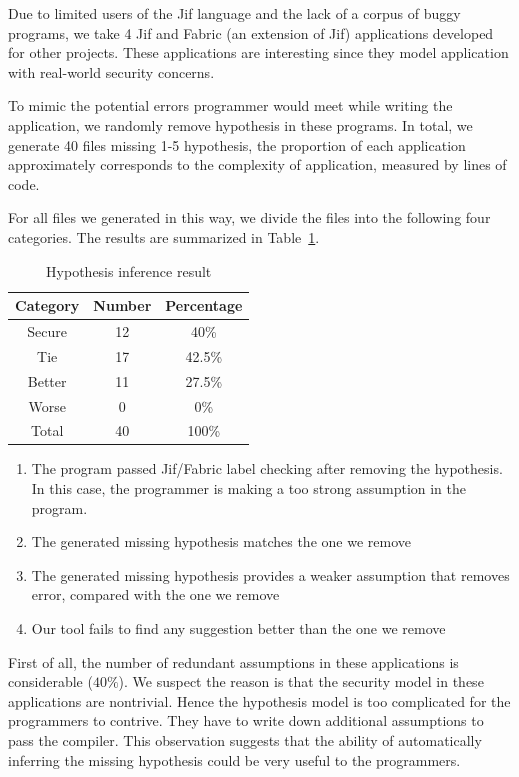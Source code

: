 Due to limited users of the Jif language and the lack of a corpus of
buggy programs, we take 4 Jif and Fabric (an extension of Jif)
applications developed for other projects. These applications are
interesting since they model application with real-world security
concerns.

To mimic the potential errors programmer would meet while writing the
application, we randomly remove hypothesis in these programs. In
total, we generate 40 files missing 1-5 hypothesis, the proportion of
each application approximately corresponds to the complexity of
application, measured by lines of code.

For all files we generated in this way, we divide the files into the
following four categories. The results are summarized in
Table~\ref{table:hyporesult}.

\begin{table}
\centering
\begin{tabular}{|c | c | c|}
\hline
Category & Number & Percentage \\
\hline
Secure & 12 & 40\% \\
\hline
Tie & 17 & 42.5\% \\
\hline
Better & 11 & 27.5\% \\
\hline
Worse & 0 & 0\% \\
\hline
Total & 40 & 100\% \\
\hline
\end{tabular}
\label{table:hyporesult}
\caption{Hypothesis inference result}
\end{table}

\begin{enumerate}
\item The program passed Jif/Fabric label checking after removing the
hypothesis. In this case, the programmer is making a too strong
assumption in the program.

\item The generated missing hypothesis matches the one we remove

\item The generated missing hypothesis provides a weaker assumption
that removes error, compared with the one we remove

\item Our tool fails to find any suggestion better than the one we
remove
\end{enumerate}

First of all, the number of redundant assumptions in these
applications is considerable ($40\%$). We suspect the reason is that
the security model in these applications are nontrivial. Hence the
hypothesis model is too complicated for the programmers to contrive.
They have to write down additional assumptions to pass the compiler.
This observation suggests that the ability of automatically inferring
the missing hypothesis could be very useful to the programmers.

